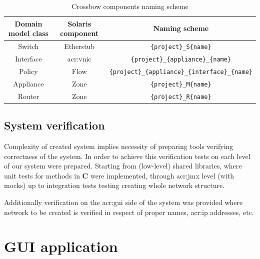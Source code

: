 \documentclass[11pt]{book}
\begin{document}
        \begin{table}[H]
          \centering

          \begin{tabular}{|c|c|c|}
            \hline
            Domain model class & Solaris component & Naming scheme                                                \\
            \hline \hline
            Switch             & Etherstub         & \texttt{\{project\}\_S\{name\}}                              \\
            \hline
            Interface          & \gls{acr:vnic}    & \texttt{\{project\}\_\{appliance\}\_\{name\}}                \\
            \hline
            Policy             & Flow              & \texttt{\{project\}\_\{appliance\}\_\{interface\}\_\{name\}} \\
            \hline
            Appliance          & Zone              & \texttt{\{project\}\_M\{name\}}                              \\
            \hline
            Router             & Zone              & \texttt{\{project\}\_R\{name\}}                              \\
            \hline
          \end{tabular}

          \caption{Crossbow components naming scheme}
          \label{tab:impl:naming}
        \end{table}
		

      \subsection{System verification}
      \label{sec:impl:verif}
		
        Complexity of created system implies necessity of preparing tools verifying correctness of the system. In order
        to achieve this verification tests on each level of our system were prepared. Starting from (low-level) shared
        libraries, where unit tests for methods in \textbf{C} were implemented, through \gls{acr:jmx} level (with mocks)
        up to integration tests testing creating whole network structure.
      
        Additionally verification on the \gls{acr:gui} side of the system was provided where network to be created is
        verified in respect of proper names, \gls{acr:ip} addresses, etc.


      \section{GUI application}
      \label{sec:impl:gui}
		
\end{document}
